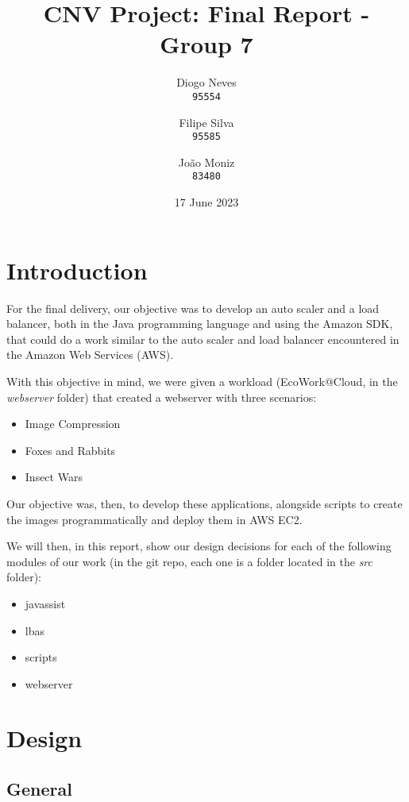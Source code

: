 \documentclass{article}
\date{17 June 2023}
\title{CNV Project: Final Report - Group 7}
\author{
    Diogo Neves \\
    \texttt{95554}
    \and
    Filipe Silva \\
    \texttt{95585}
    \and
    João Moniz \\
    \texttt{83480}
}
\begin{document}
\setcounter{page}{0}

\maketitle

\twocolumn

\section{Introduction}

For the final delivery, our objective was to develop an auto scaler and a load
balancer, both in the Java programming language and using the Amazon SDK, that
could do a work similar to the auto scaler and load balancer encountered in the
Amazon Web Services (AWS).

With this objective in mind, we were given a workload (EcoWork@Cloud, in the
\textit{webserver} folder) that created a webserver with three scenarios:

\begin{itemize}
    \item Image Compression
    \item Foxes and Rabbits
    \item Insect Wars
\end{itemize}

Our objective was, then, to develop these applications, alongside scripts to
create the images programmatically and deploy them in AWS EC2.

We will then, in this report, show our design decisions for each of the
following modules of our work (in the git repo, each one is a folder located in
the \textit{src} folder):

\begin{itemize}
    \item javassist
    \item lbas
    \item scripts
    \item webserver
\end{itemize}

\section{Design}

\subsection{General}
\end{document}
